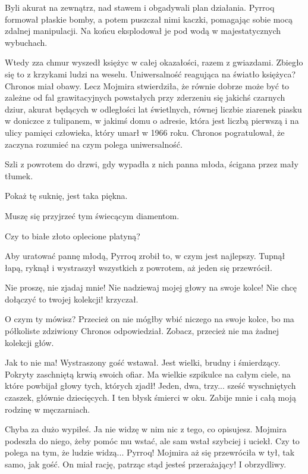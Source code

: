 \divider{}

Byli akurat na zewnątrz, nad stawem i obgadywali plan działania. 
Pyrroq formował płaskie bomby, a potem puszczał nimi kaczki, pomagając sobie mocą zdalnej manipulacji.
Na końcu eksplodował je pod wodą w majestatycznych wybuchach.

Wtedy zza chmur wyszedł księżyc w całej okazałości, razem z gwiazdami.
Zbiegło się to z krzykami ludzi na weselu. 
Uniwersalność reagująca na światło księżyca? Chronos miał obawy.
Lecz Mojmira stwierdziła, że równie dobrze może być to zależne od fal grawitacyjnych powstałych przy zderzeniu się jakichś czarnych dziur, akurat będących 
w odległości lat świetlnych, równej liczbie ziarenek piasku w doniczce z 
tulipanem, w jakimś domu o adresie, która jest liczbą pierwszą i na ulicy pamięci człowieka, który umarł w 1966 roku.
Chronos pogratulował, że zaczyna rozumieć na czym polega uniwersalność.

Szli z powrotem do drzwi, gdy wypadła z nich panna młoda, ścigana przez mały tłumek.

\ds{} Pokaż tę suknię, jest taka piękna. \de{}

\ds{} Muszę się przyjrzeć tym świecącym diamentom. \de{}

\ds{} Czy to białe złoto oplecione platyną? \de{}

Aby uratować pannę młodą, Pyrroq zrobił to, w czym jest najlepszy. Tupnął łapą, ryknął i wystraszył wszystkich z powrotem, aż jeden się przewrócił.

\ds{} Nie proszę, nie zjadaj mnie! Nie nadziewaj mojej głowy na swoje kolce! Nie chcę dołączyć to twojej kolekcji! \dm{} krzyczał. \de{}

\ds{} O czym ty mówisz? Przecież on nie mógłby wbić niczego na swoje kolce, bo ma półkoliste \dm{} zdziwiony Chronos odpowiedział. \dm{}
Zobacz, przecież nie ma żadnej kolekcji głów. \de{}

\ds{} Jak to nie ma! \dm{} Wystraszony gość wstawał. \dm{} Jest wielki, brudny i śmierdzący. Pokryty zaschniętą krwią swoich ofiar.
Ma wielkie szpikulce na całym ciele, na które powbijał głowy tych, których zjadł! Jeden, dwa, trzy... sześć wyschniętych czaszek, głównie dziecięcych.
I ten błysk śmierci w oku. Zabije mnie i całą moją rodzinę w męczarniach. \de{}

\ds{} Chyba za dużo wypiłeś. Ja nie widzę w nim nic z tego, co opisujesz. \dm{} Mojmira podeszła do niego, żeby pomóc mu wstać, ale sam wstał szybciej i uciekł. \dm{}
Czy to polega na tym, że ludzie widzą... Pyrroq! \dm{} Mojmira aż się przewróciła w tył, tak samo, jak gość. \dm{} On miał rację, patrząc stąd jesteś przerażający! I obrzydliwy. \de{}

